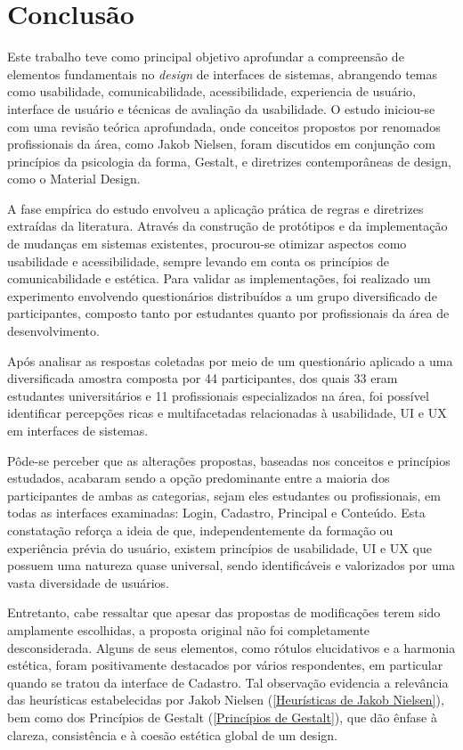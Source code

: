 \chapter[Conclusão]{Conclusão}
\label{capConclusao}

Este trabalho teve como principal objetivo aprofundar a compreensão de elementos fundamentais no \textit{design} de interfaces de sistemas, abrangendo temas como usabilidade, comunicabilidade, acessibilidade, experiencia de usuário, interface de usuário e técnicas de avaliação da usabilidade. O estudo iniciou-se com uma revisão teórica aprofundada, onde conceitos propostos por renomados profissionais da área, como Jakob Nielsen, foram discutidos em conjunção com princípios da psicologia da forma, Gestalt, e diretrizes contemporâneas de design, como o Material Design.

A fase empírica do estudo envolveu a aplicação prática de regras e diretrizes extraídas da literatura. Através da construção de protótipos e da implementação de mudanças em sistemas existentes, procurou-se otimizar aspectos como usabilidade e acessibilidade, sempre levando em conta os princípios de comunicabilidade e estética. Para validar as implementações, foi realizado um experimento envolvendo questionários distribuídos a um grupo diversificado de participantes, composto tanto por estudantes quanto por profissionais da área de desenvolvimento.

Após analisar as respostas coletadas por meio de um questionário aplicado a uma diversificada amostra composta por 44 participantes, dos quais 33 eram estudantes universitários e 11 profissionais especializados na área, foi possível identificar percepções ricas e multifacetadas relacionadas à usabilidade, \ac{UI} e \ac{UX} em interfaces de sistemas.

Pôde-se perceber que as alterações propostas, baseadas nos conceitos e princípios estudados, acabaram sendo a opção predominante entre a maioria dos participantes de ambas as categorias, sejam eles estudantes ou profissionais, em todas as interfaces examinadas: Login, Cadastro, Principal e Conteúdo. Esta constatação reforça a ideia de que, independentemente da formação ou experiência prévia do usuário, existem princípios de usabilidade, \ac{UI} e \ac{UX} que possuem uma natureza quase universal, sendo identificáveis e valorizados por uma vasta diversidade de usuários.

Entretanto, cabe ressaltar que apesar das propostas de modificações terem sido amplamente escolhidas, a proposta original não foi completamente desconsiderada. Alguns de seus elementos, como rótulos elucidativos e a harmonia estética, foram positivamente destacados por vários respondentes, em particular quando se tratou da interface de Cadastro. Tal observação evidencia a relevância das heurísticas estabelecidas por Jakob Nielsen (\ref{Heurísticas de Jakob Nielsen}), bem como dos  Princípios de Gestalt (\ref{Princípios de Gestalt}), que dão ênfase à clareza, consistência e à coesão estética global de um design.

